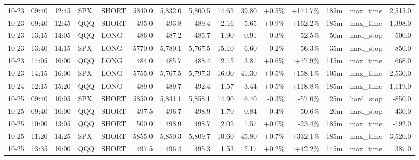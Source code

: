 \documentclass[11pt,a4paper,twoside]{article}
\begin{document}
\begin{landscape}
\begin{center}
\begin{longtable}{>{\color{txtmain}}l l l l l r r r r r r r r >{\color{txtmain}}l r}
10-23 & 09:40 & 12:45 & SPX & SHORT & 5840.0 & 5,832.0 & 5,800.5 & 14.65 & 39.80 & \textcolor{wingreen}{+0.5\%} & \textcolor{wingreen}{+171.7\%} & 185m & max\_time & \textcolor{wingreen}{2,515.0} \\
10-23 & 09:40 & 12:45 & QQQ & SHORT & 495.0 & 493.8 & 489.4 & 2.16 & 5.65 & \textcolor{wingreen}{+0.9\%} & \textcolor{wingreen}{+162.2\%} & 185m & max\_time & \textcolor{wingreen}{1,398.0} \\
10-23 & 13:15 & 14:05 & QQQ & LONG & 486.0 & 487.2 & 485.7 & 1.90 & 0.91 & \textcolor{lossred}{-0.3\%} & \textcolor{lossred}{-52.5\%} & 50m & hard\_stop & \textcolor{lossred}{-500.0} \\
10-23 & 13:40 & 14:15 & SPX & LONG & 5770.0 & 5,780.1 & 5,767.5 & 15.10 & 6.60 & \textcolor{lossred}{-0.2\%} & \textcolor{lossred}{-56.3\%} & 35m & hard\_stop & \textcolor{lossred}{-850.0} \\
10-23 & 14:05 & 16:00 & QQQ & LONG & 484.0 & 485.7 & 488.4 & 2.15 & 3.81 & \textcolor{wingreen}{+0.6\%} & \textcolor{wingreen}{+77.9\%} & 115m & max\_time & \textcolor{wingreen}{668.0} \\
10-23 & 14:15 & 16:00 & SPX & LONG & 5755.0 & 5,767.5 & 5,797.3 & 16.00 & 41.30 & \textcolor{wingreen}{+0.5\%} & \textcolor{wingreen}{+158.1\%} & 105m & max\_time & \textcolor{wingreen}{2,530.0} \\
10-24 & 12:15 & 15:20 & QQQ & LONG & 489.0 & 489.7 & 492.4 & 1.57 & 3.44 & \textcolor{wingreen}{+0.5\%} & \textcolor{wingreen}{+118.8\%} & 185m & max\_time & \textcolor{wingreen}{1,119.0} \\
10-25 & 09:40 & 10:05 & SPX & SHORT & 5850.0 & 5,841.1 & 5,858.1 & 14.90 & 6.40 & \textcolor{lossred}{-0.3\%} & \textcolor{lossred}{-57.0\%} & 25m & hard\_stop & \textcolor{lossred}{-850.0} \\
10-25 & 09:40 & 10:00 & QQQ & SHORT & 497.5 & 496.7 & 498.9 & 1.70 & 0.84 & \textcolor{lossred}{-0.4\%} & \textcolor{lossred}{-50.6\%} & 20m & hard\_stop & \textcolor{lossred}{-430.0} \\
10-25 & 10:00 & 13:05 & QQQ & SHORT & 500.0 & 498.9 & 498.7 & 2.05 & 1.57 & \textcolor{wingreen}{+0.0\%} & \textcolor{lossred}{-23.4\%} & 185m & max\_time & \textcolor{lossred}{-192.0} \\
10-25 & 11:20 & 14:25 & SPX & SHORT & 5855.0 & 5,850.3 & 5,809.7 & 10.60 & 45.80 & \textcolor{wingreen}{+0.7\%} & \textcolor{wingreen}{+332.1\%} & 185m & max\_time & \textcolor{wingreen}{3,520.0} \\
10-25 & 13:35 & 16:00 & QQQ & SHORT & 497.5 & 496.4 & 495.3 & 1.53 & 2.17 & \textcolor{wingreen}{+0.2\%} & \textcolor{wingreen}{+42.2\%} & 145m & max\_time & \textcolor{wingreen}{387.0} \\

\end{longtable}
\end{center}
\end{landscape}
\end{document}
